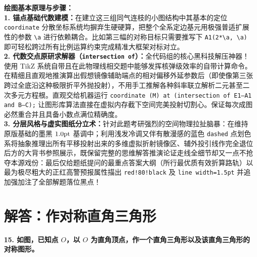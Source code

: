 {\small\color{blue!70!black}
\textbf{绘图基本原理与步骤：}\\
\textbf{1. 锚点基础代数建模：}在建立这三组同气连枝的小图结构中其基本的定位 \texttt{coordinate} 分散坐标系统均摒弃生硬硬算，把整个全系定边基元用极强普适扩展性的参数 \texttt{\textbackslash a} 进行依赖耦合。比如第三幅的对称目标只需要推写下 \texttt{A1(2*\textbackslash a, \textbackslash a)} 即可轻松跨过所有比例运算约束完成精准大框架对标对立。\\
\textbf{2. 代数交点原研求解器（\texttt{intersection of}）：}全代码组的核心黑科技解压神器！使用 TikZ 系统自带且在此物理线相交题中能够发挥核弹级效率的自带计算命令。在精细且直观地推演算出假想镜像辅助端点的相对偏移外延参数后（即使像第三张跨过全底沿这种极限折平外抛投射），不用手工推解各种斜率联立解析二元甚至二次多元方程根。直观交给机器运行 \texttt{coordinate (M) at (intersection of E1--A1 and B--C);} 让图形库算法直接在虚拟内存截下空间完美投射切割心。保证每次成图必然重合并且具备小数点满位精确度。\\
\textbf{3. 分层风格与虚实图纸分立术：}针对此题考研强烈的空间物理拉扯脑暴：在维持原版基础的墨黑 $1.0\rm{pt}$ 基调中；利用浅发冷调又伴有散漫感的蓝色 \texttt{dashed} 点划色系将抽象推理出所有平移投射出来的多维虚拟折射镜像区、辅外投引线作完全退位后方的大背书参照展示，既保留完整的思维解答推演论证走线全细节却又一点不抢夺本源戏份：最后仅给题纸提问的最重点答案大纲（所行最优质有效折算路轨）以最为极尽粗大的正红高警预报属性描出 \texttt{red!80!black} 及 \texttt{line width=1.5pt} 并追加强加注了全部解题落位黑点！
}

\newpage



\section{解答：作对称直角三角形}

\vspace{0.6cm}

\textbf{15. 如图，已知点 $O$，以 $O$ 为直角顶点，作一个直角三角形以及该直角三角形的对称图形。}

\vspace{0.4cm}

